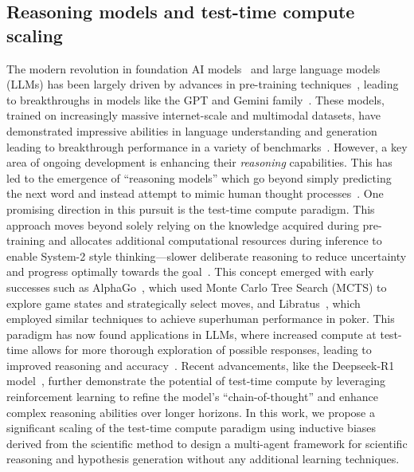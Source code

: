 \subsection{Reasoning models and test-time compute scaling}
The modern revolution in foundation AI models~\citep{bommasani2021opportunities} and large language models (LLMs) has been largely driven by advances in pre-training techniques~\citep{erhan2010does, radford2018improving}, leading to breakthroughs in models like the GPT and Gemini family~\citep{team2023gemini, achiam2023gpt}. These models, trained on increasingly massive internet-scale and multimodal datasets, have demonstrated impressive abilities in language understanding and generation leading to breakthrough performance in a variety of benchmarks~\citep{chowdhery2022palm, google2023palm2}.  However, a key area of ongoing development is enhancing their \textit{reasoning} capabilities. This has led to the emergence of ``reasoning models'' which go beyond simply predicting the next word and instead attempt to mimic human thought processes~\citep{wei2022chain}. One promising direction in this pursuit is the test-time compute paradigm.  This approach moves beyond solely relying on the knowledge acquired during pre-training and allocates additional computational resources during inference to enable System-2 style thinking---slower deliberate reasoning to reduce uncertainty and progress optimally towards the goal~\citep{kahneman2011thinking}. This concept emerged with early successes such as AlphaGo~\citep{silver2016mastering}, which used Monte Carlo Tree Search (MCTS) to explore game states and strategically select moves, and Libratus~\citep{brown2019superhuman}, which employed similar techniques to achieve superhuman performance in poker. This paradigm has now found applications in LLMs, where increased compute at test-time allows for more thorough exploration of possible responses, leading to improved reasoning and accuracy~\citep{wei2022chain, yao2024tree, zelikman2022star, chen2024more, snell2024scaling,4928, muennighoff2025s1, tu2024towards}. Recent advancements, like the Deepseek-R1 model~\citep{guo2025deepseek}, further demonstrate the potential of test-time compute by leveraging reinforcement learning to refine the model's ``chain-of-thought'' and enhance complex reasoning abilities over longer horizons. In this work, we propose a significant scaling of the test-time compute paradigm using inductive biases derived from the scientific method to design a multi-agent framework for scientific reasoning and hypothesis generation without any additional learning techniques.

